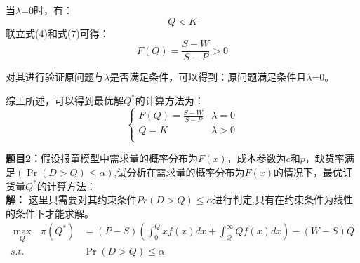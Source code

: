 \documentclass[12pt,a4paper]{article}
\begin{document}
当$\lambda$=0时，有：
\begin{equation}
    Q<K
\end{equation}
联立式(4)和式(7)可得：
\begin{equation}
    F\left(Q\right)=\frac{S-W}{S-P} >0
\end{equation}

对其进行验证原问题与$\lambda$是否满足条件，可以得到：原问题满足条件且$\lambda$=0。

综上所述，可以得到最优解$Q^*$的计算方法为：
\begin{equation}
    \left\{ \begin{matrix}
        F\left(Q\right)=\frac{S-W}{S-P}  &	 \lambda=0	\\
        Q=K  &	\lambda>0	\\
    \end{matrix} \right. 
\end{equation}



\vspace{5pt}
\noindent
{\bf 题目2：}假设报童模型中需求量的概率分布为$F(x)$，成本参数为$c$和$p$，缺货率满足$(\Pr\left(D > Q\right)\leq \alpha )$,试分析在需求量的概率分布为$F(x)$的情况下，最优订货量$Q^*$的计算方法：
\vspace{5pt}
\noindent \\
{\bf 解：}
这里只需要对其约束条件$Pr\left(D > Q\right)\leq \alpha$进行判定,只有在约束条件为线性的条件下才能求解。
\begin{align}
    \max_Q\text{\ }\pi \left( Q^{*} \right) &=\left( P-S \right) \left( \int_0^Q{xf\left( x \right) dx+\int_Q^{\infty}{Qf\left( x \right) dx}} \right) -\left( W-S \right) Q \\
    s.t.&\Pr\left(D > Q\right)\leq \alpha
\end{align}
\end{document}
